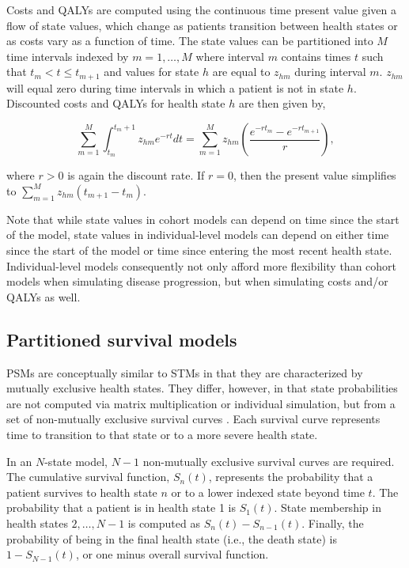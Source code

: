 \documentclass[article, nojss]{jss}\usepackage[]{graphicx}\usepackage[]{color}
\begin{document}
Costs and QALYs are computed using the continuous time present value given a flow of state values, which change as patients transition between health states or as costs vary as a function of time. The state values can be partitioned into $M$ time intervals indexed by $m = 1,\ldots, M$ where interval $m$ contains times $t$ such that $t_m < t \leq t_{m+1}$ and values for state $h$ are equal to $z_{hm}$ during interval $m$. $z_{hm}$ will equal zero during time intervals in which a patient is not in state $h$. Discounted costs and QALYs for health state $h$ are then given by,  

\begin{equation}
\sum_{m = 1}^M \int_{t_m}^{t_m+1} z_{hm}e^{-rt}dt = \sum_{m = 1}^M z_{hm} \left(\frac{e^{-r{t_{m}}} - e^{-r{t_{m+1}}}}{r}\right),
\end{equation}

where $r > 0$ is again the discount rate. If $r = 0$, then the present value simplifies to $\sum_{m = 1}^M z_{hm}(t_{m+1} - t_{m})$. 

Note that while state values in cohort models can depend on time since the start of the model, state values in individual-level models can depend on either time since the start of the model or time since entering the most recent health state. Individual-level models consequently not only afford more flexibility than cohort models when simulating disease progression, but when simulating costs and/or QALYs as well.

\subsection{Partitioned survival models} \label{sec:PSMs}
PSMs are conceptually similar to STMs in that they are characterized by mutually exclusive health states. They differ, however, in that state probabilities are not computed via matrix multiplication or individual simulation, but from a set of non-mutually exclusive survival curves \citep{glasziou1990quality, woods2017nice}. Each survival curve represents time to transition to that state or to a more severe health state.

In an $N$-state model, $N-1$ non-mutually exclusive survival curves are required. The cumulative survival function, $S_n(t)$, represents the probability that a patient survives to health state $n$ or to a lower indexed state beyond time $t$. The probability that a patient is in health state 1 is $S_1(t)$. State membership in health states $2,\ldots, N-1$ is computed as $S_{n}(t) - S_{n-1}(t)$. Finally, the probability of being in the final health state (i.e., the death state) is $1-S_{N-1}(t)$, or one minus overall survival function.
\end{document}
